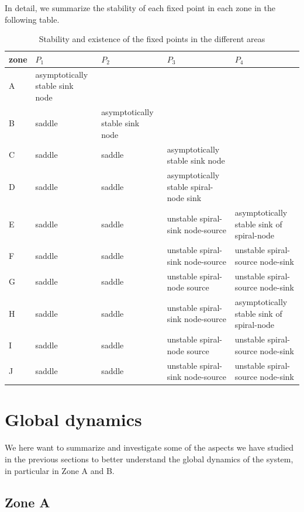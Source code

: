\documentclass[10pt]{Configuration_Files/PoliMi3i_thesis}
\begin{document}
In detail, we summarize the stability of each fixed point in each zone in the following table.
\begin{table}[H]
    \centering
    \begin{tabular}{|C{1cm}|C{3cm}|C{3cm}|C{3cm}|C{3cm}|}
    \hline
      zone  &  $P_1$ & $P_2$ & $P_3$ & $P_4$ \\
    \hline
       A  & asymptotically stable sink node &  &  &  \\
    \hline 
       B & saddle & asymptotically stable sink node &  & \\
    \hline
        C & saddle & saddle & asymptotically stable sink node & \\
    \hline
         D & saddle & saddle & asymptotically stable spiral-node sink & \\
    \hline
         E & saddle & saddle & unstable spiral-sink node-source & asymptotically stable sink of spiral-node\\
    \hline
         F & saddle & saddle & unstable spiral-sink node-source &  unstable spiral-source node-sink \\
    \hline
         G & saddle & saddle & unstable spiral-node source &  unstable spiral-source node-sink \\
    \hline
         H & saddle & saddle & unstable spiral-sink node-source & asymptotically stable sink of spiral-node\\
    \hline
         I & saddle & saddle & unstable spiral-node source &  unstable spiral-source node-sink \\
    \hline
         J  & saddle & saddle & unstable spiral-sink node-source &  unstable spiral-source node-sink \\
    \hline
    \end{tabular}
    \caption{Stability and existence of the fixed points in the different areas}
    \label{tab:my_label}
\end{table}

\chapter{Global dynamics} 

We here want to summarize and investigate some of the aspects we have studied in the previous sections to better understand the global dynamics of the system, in particular in Zone A and B.

\section{Zone A}
\end{document}
